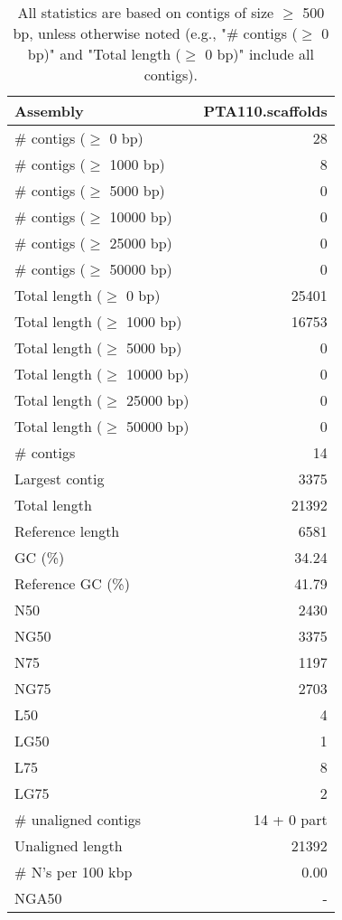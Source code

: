 \documentclass[12pt,a4paper]{article}
\begin{document}
\begin{table}[ht]
\begin{center}
\caption{All statistics are based on contigs of size $\geq$ 500 bp, unless otherwise noted (e.g., "\# contigs ($\geq$ 0 bp)" and "Total length ($\geq$ 0 bp)" include all contigs).}
\begin{tabular}{|l*{1}{|r}|}
\hline
Assembly & PTA110.scaffolds \\ \hline
\# contigs ($\geq$ 0 bp) & 28 \\ \hline
\# contigs ($\geq$ 1000 bp) & 8 \\ \hline
\# contigs ($\geq$ 5000 bp) & 0 \\ \hline
\# contigs ($\geq$ 10000 bp) & 0 \\ \hline
\# contigs ($\geq$ 25000 bp) & 0 \\ \hline
\# contigs ($\geq$ 50000 bp) & 0 \\ \hline
Total length ($\geq$ 0 bp) & 25401 \\ \hline
Total length ($\geq$ 1000 bp) & 16753 \\ \hline
Total length ($\geq$ 5000 bp) & 0 \\ \hline
Total length ($\geq$ 10000 bp) & 0 \\ \hline
Total length ($\geq$ 25000 bp) & 0 \\ \hline
Total length ($\geq$ 50000 bp) & 0 \\ \hline
\# contigs & 14 \\ \hline
Largest contig & 3375 \\ \hline
Total length & 21392 \\ \hline
Reference length & 6581 \\ \hline
GC (\%) & 34.24 \\ \hline
Reference GC (\%) & 41.79 \\ \hline
N50 & 2430 \\ \hline
NG50 & 3375 \\ \hline
N75 & 1197 \\ \hline
NG75 & 2703 \\ \hline
L50 & 4 \\ \hline
LG50 & 1 \\ \hline
L75 & 8 \\ \hline
LG75 & 2 \\ \hline
\# unaligned contigs & 14 + 0 part \\ \hline
Unaligned length & 21392 \\ \hline
\# N's per 100 kbp & 0.00 \\ \hline
NGA50 & - \\ \hline
\end{tabular}
\end{center}
\end{table}
\end{document}
